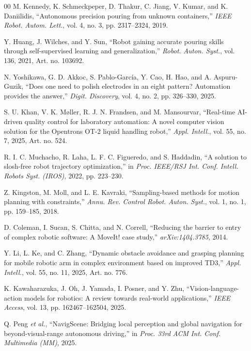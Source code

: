 \documentclass{ieeeaccess}
\newif\ifhighlight
\newcommand{\rev}[1]{\ifhighlight\hl{#1}\else#1\fi}
\begin{document}
\begin{thebibliography}{00}
 M. Kennedy, K. Schmeckpeper, D. Thakur, C. Jiang, V. Kumar, and K. Daniilidis, ``Autonomous precision pouring from unknown containers,'' \emph{IEEE Robot. Autom. Lett.}, vol. 4, no. 3, pp. 2317--2324, 2019.

 Y. Huang, J. Wilches, and Y. Sun, ``Robot gaining accurate pouring skills through self-supervised learning and generalization,'' \emph{Robot. Auton. Syst.}, vol. 136, 2021, Art. no. 103692.

 N. Yoshikawa, G. D. Akkoc, S. Pablo-Garc\'ia, Y. Cao, H. Hao, and A. Aspuru-Guzik, ``Does one need to polish electrodes in an eight pattern? Automation provides the answer,'' \emph{Digit. Discovery}, vol. 4, no. 2, pp. 326--330, 2025.

 S. U. Khan, V. K. M\o ller, R. J. N. Frandsen, and M. Mansourvar, ``Real-time AI-driven quality control for laboratory automation: A novel computer vision solution for the Opentrons OT-2 liquid handling robot,'' \emph{Appl. Intell.}, vol. 55, no. 7, 2025, Art. no. 524.

 R. I. C. Muchacho, R. Laha, L. F. C. Figueredo, and S. Haddadin, ``A solution to slosh-free robot trajectory optimization,'' in \emph{Proc. IEEE/RSJ Int. Conf. Intell. Robots Syst. (IROS)}, 2022, pp. 223--230.

 Z. Kingston, M. Moll, and L. E. Kavraki, ``Sampling-based methods for motion planning with constraints,'' \emph{Annu. Rev. Control Robot. Auton. Syst.}, vol. 1, no. 1, pp. 159--185, 2018.

 D. Coleman, I. Sucan, S. Chitta, and N. Correll, ``Reducing the barrier to entry of complex robotic software: A MoveIt! case study,'' \emph{arXiv:1404.3785}, 2014.

 Y. Li, L. Ke, and C. Zhang, ``Dynamic obstacle avoidance and grasping planning for mobile robotic arm in complex environment based on improved TD3,'' \emph{Appl. Intell.}, vol. 55, no. 11, 2025, Art. no. 776.

 K. Kawaharazuka, J. Oh, J. Yamada, I. Posner, and Y. Zhu, ``Vision-language-action models for robotics: A review towards real-world applications,'' \emph{IEEE Access}, vol. 13, pp. 162467--162504, 2025.

 \rev{Q. Peng \emph{et al.}, ``NavigScene: Bridging local perception and global navigation for beyond-visual-range autonomous driving,'' in \emph{Proc. 33rd ACM Int. Conf. Multimedia (MM)}, 2025.}


\end{thebibliography}
\end{document}
